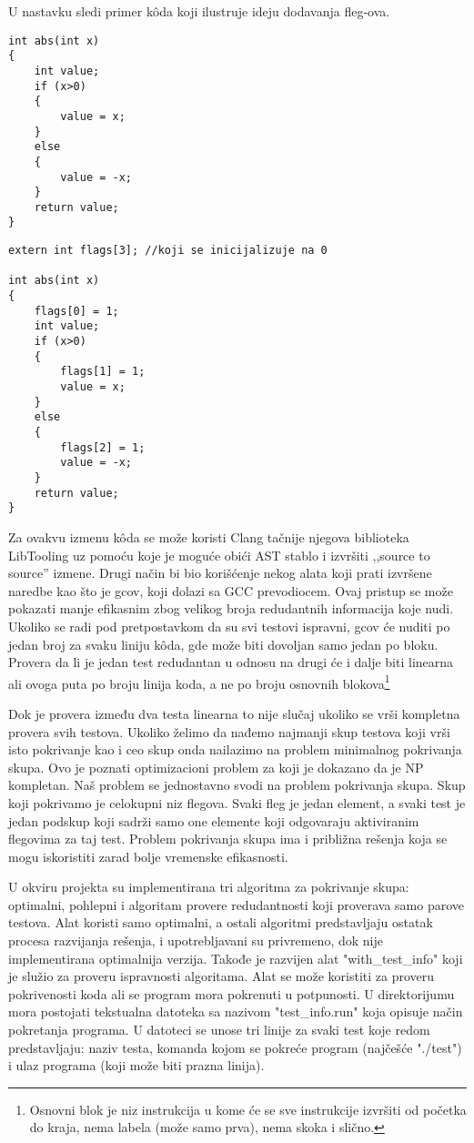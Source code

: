 \documentclass[a4paper]{article}
\begin{document}
U nastavku sledi primer kôda koji ilustruje ideju dodavanja fleg-ova.

\newpage

\begin{lstlisting}
int abs(int x)
{
	int value;
	if (x>0)
	{
		value = x;
	}
	else
	{
		value = -x;
	}
	return value;
}
\end{lstlisting}

\begin{lstlisting}
extern int flags[3]; //koji se inicijalizuje na 0

int abs(int x)
{
	flags[0] = 1;
	int value;
	if (x>0)
	{
		flags[1] = 1;
		value = x;
	}
	else
	{
		flags[2] = 1;
		value = -x;
	}
	return value;
}
\end{lstlisting}

Za ovakvu izmenu kôda se može koristi Clang tačnije njegova biblioteka LibTooling uz pomoću koje je moguće obići AST stablo i izvršiti ,,source to source'' izmene. Drugi način bi bio korišćenje nekog alata koji prati izvršene naredbe kao što je gcov, koji dolazi sa GCC prevodiocem. Ovaj pristup se može pokazati manje efikasnim zbog velikog broja redudantnih informacija koje nudi. Ukoliko se radi pod pretpostavkom da su svi testovi ispravni, gcov će nuditi po jedan broj za svaku liniju kôda, gde može biti dovoljan samo jedan po bloku. Provera da li je jedan test redudantan u odnosu na drugi će i dalje biti linearna ali ovoga puta po broju linija koda, a ne po broju osnovnih blokova\footnote{Osnovni blok je niz instrukcija u kome će se sve instrukcije izvršiti od početka do kraja, nema labela (može samo prva), nema skoka i slično.} 

Dok je provera između dva testa linearna to nije slučaj ukoliko se vrši kompletna provera svih testova. Ukoliko želimo da nađemo najmanji skup testova koji vrši isto pokrivanje kao i ceo skup onda nailazimo na problem minimalnog pokrivanja skupa. Ovo je poznati optimizacioni problem za koji je dokazano da je NP kompletan. Naš problem se jednostavno svodi na problem pokrivanja skupa. Skup koji pokrivamo je celokupni niz flegova. Svaki fleg je jedan element, a svaki test je jedan podskup koji sadrži samo one elemente koji odgovaraju aktiviranim flegovima za taj test. Problem pokrivanja skupa ima i približna rešenja koja se mogu iskoristiti zarad bolje vremenske efikasnosti. 

U okviru projekta su implementirana tri algoritma za pokrivanje skupa: optimalni, pohlepni i algoritam provere redudantnosti koji proverava samo parove testova. Alat koristi samo optimalni, a ostali algoritmi predstavljaju ostatak procesa razvijanja rešenja, i upotrebljavani su privremeno, dok nije implementirana optimalnija verzija. Takođe je razvijen alat "with\_test\_info" \space koji je služio za proveru ispravnosti algoritama. Alat se može koristiti za proveru pokrivenosti koda ali se program mora pokrenuti u potpunosti. U direktorijumu mora postojati tekstualna datoteka sa nazivom "test\_info.run" \space koja opisuje način pokretanja programa. U datoteci se unose tri linije za svaki test koje redom predstavljaju: naziv testa, komanda kojom se pokreće program (najčešće "./test") i ulaz programa (koji može biti prazna linija).
\end{document}
